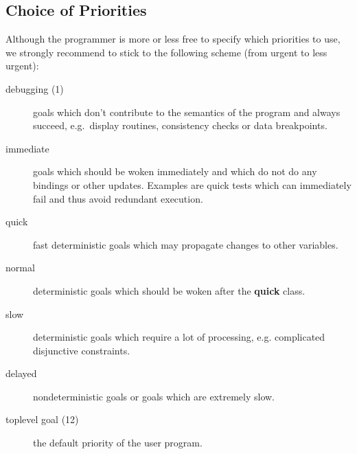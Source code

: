 \subsection{Choice of Priorities}
Although the programmer is more or less free to specify
which priorities to use, we strongly recommend
to stick to the following scheme (from urgent to less urgent):
\begin{description}
\item [debugging (1)]  goals which don't contribute to the semantics
of the program and always succeed, e.g.\ display routines, consistency
checks or data breakpoints.

\item [immediate]  goals which should be woken immediately
and which do not do any bindings or other updates.
Examples are quick tests which can immediately fail and
thus avoid redundant execution.

\item [quick]  fast deterministic goals which may
propagate changes to other variables.

\item [normal]  deterministic goals which should be woken
after the {\bf quick} class.

\item [slow]  deterministic goals which require
a lot of processing, e.g. complicated disjunctive
constraints.

\item [delayed]  nondeterministic goals
or goals which are extremely slow.

\item [toplevel goal (12)]  the default priority of the user program.
\end{description}




